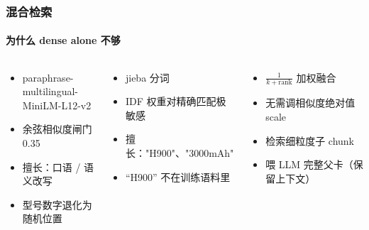 \documentclass[aspectratio=169,10pt]{beamer}
\newcommand{\mono}[1]{{\ttfamily\small\color{Cblue!90!black}#1}}  %
\begin{document}
\begin{frame}
\frametitle{混合检索}
\framesubtitle{为什么 dense alone 不够}

\begin{columns}[T]
\begin{tcolorbox}[tcblue, title={\color{Cblue}Dense（语义）}]
\small\begin{itemize}\setlength\itemsep{0.25em}
  \item paraphrase-multilingual-\\MiniLM-L12-v2
  \item 余弦相似度闸门 \mono{0.35}
  \item 擅长：口语 / 语义改写
  \item {\small\color{Cmuted}型号数字退化为随机位置}
\end{itemize}
\end{tcolorbox}

\begin{tcolorbox}[tcamber, title={\color{orange!80!black}BM25（词法）}]
\small\begin{itemize}\setlength\itemsep{0.25em}
  \item jieba 分词
  \item IDF 权重对精确匹配极敏感
  \item 擅长：\mono{"H900"}、\mono{"3000mAh"}
  \item {\small\color{Cmuted}``H900'' 不在训练语料里}
\end{itemize}
\end{tcolorbox}

\begin{tcolorbox}[tcgreen, title={\color{Cgreen}RRF + 父子文档}]
\small\begin{itemize}\setlength\itemsep{0.25em}
  \item $\tfrac{1}{k+\mathrm{rank}}$ 加权融合
  \item 无需调相似度绝对值 scale
  \item 检索细粒度子 chunk
  \item 喂 LLM 完整父卡（保留上下文）
\end{itemize}
\end{tcolorbox}
\end{columns}

\vspace{0.25cm}


\end{frame}
\end{document}
